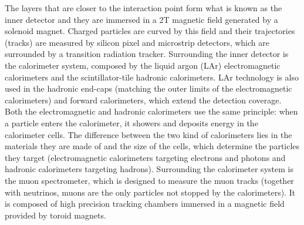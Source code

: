 \documentclass[main]{subfiles} %
\begin{document}
The layers \cite{Airapetian1999} that are closer to the interaction point form what is known as the inner detector and they are immersed in a 2\;T magnetic field generated by a solenoid magnet. Charged particles are curved by this field and their trajectories (tracks) are measured by silicon pixel and microstrip detectors, which are surrounded by a transition radiation tracker. Surrounding the inner detector is the calorimeter system, composed by the liquid argon (LAr) electromagnetic calorimeters and the scintillator-tile hadronic calorimeters. LAr technology is also used in the hadronic end-caps (matching the outer limits of the electromagnetic calorimeters) and forward calorimeters, which extend the detection coverage. Both the electromagnetic and hadronic calorimeters use the same principle: when a particle enters the calorimeter, it showers and deposits energy in the calorimeter cells. The difference between the two kind of calorimeters lies in the materials they are made of and the size of the cells, which determine the particles they target (electromagnetic calorimeters targeting electrons and photons and hadronic calorimeters targeting hadrons). Surrounding the calorimeter system is the muon spectrometer, which is designed to measure the muon tracks (together with neutrinos, muons are the only particles not stopped by the calorimeters). It is composed of high precision tracking chambers immersed in a magnetic field provided by toroid magnets.\\



















\biblio
\end{document}
